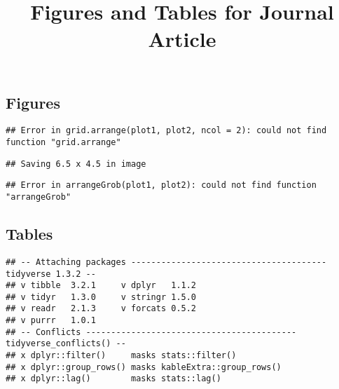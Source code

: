 \documentclass[
]{article}
\title{Figures and Tables for Journal Article}
\author{}
\date{\vspace{-2.5em}}
\begin{document}
\maketitle

\hypertarget{figures}{%
\subsection{Figures}\label{figures}}

\begin{verbatim}
## Error in grid.arrange(plot1, plot2, ncol = 2): could not find function "grid.arrange"
\end{verbatim}

\begin{verbatim}
## Saving 6.5 x 4.5 in image
\end{verbatim}

\begin{verbatim}
## Error in arrangeGrob(plot1, plot2): could not find function "arrangeGrob"
\end{verbatim}

\hypertarget{tables}{%
\subsection{Tables}\label{tables}}

\begin{verbatim}
## -- Attaching packages --------------------------------------- tidyverse 1.3.2 --
## v tibble  3.2.1     v dplyr   1.1.2
## v tidyr   1.3.0     v stringr 1.5.0
## v readr   2.1.3     v forcats 0.5.2
## v purrr   1.0.1     
## -- Conflicts ------------------------------------------ tidyverse_conflicts() --
## x dplyr::filter()     masks stats::filter()
## x dplyr::group_rows() masks kableExtra::group_rows()
## x dplyr::lag()        masks stats::lag()
\end{verbatim}
\end{document}
